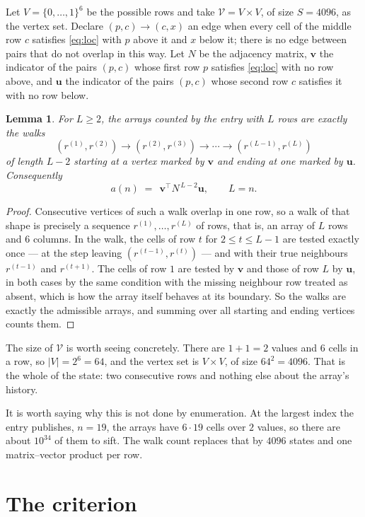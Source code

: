 \documentclass[11pt,a4paper]{article}
\theoremstyle{plain}
\newtheorem{lemma}[theorem]{Lemma}
\theoremstyle{definition}
\begin{document}
Let $V=\{0,\dots,1\}^{6}$ be the possible rows and take
$\mathcal V=V\times V$, of size $S=4096$, as the vertex set. Declare $(p,c)\to(c,x)$ an edge
when every cell of the middle row $c$ satisfies \eqref{eq:loc} with $p$ above it and $x$
below it; there is no edge between pairs that do not overlap in this way. Let $N$ be the
adjacency matrix, $\mathbf{v}$ the indicator of the pairs $(p,c)$ whose first row $p$
satisfies \eqref{eq:loc} with no row above, and $\mathbf{u}$ the indicator of
the pairs $(p,c)$ whose second row $c$ satisfies it with no row below.

\begin{lemma}\label{lem:walk}
For $L\ge2$, the arrays counted by the entry with $L$ rows are exactly the walks
\[
(r^{(1)},r^{(2)})\to(r^{(2)},r^{(3)})\to\cdots\to(r^{(L-1)},r^{(L)})
\]
of length $L-2$ starting at a vertex marked by $\mathbf{v}$ and ending at one marked by
$\mathbf{u}$. Consequently
\[
a(n)\;=\;\,\mathbf{v}^{\!\top}N^{\,L-2}\mathbf{u},\qquad L=n .
\]
\end{lemma}

\begin{proof}
Consecutive vertices of such a walk overlap in one row, so a walk of that shape is
precisely a sequence $r^{(1)},\dots,r^{(L)}$ of rows, that is, an array of $L$ rows
and $6$ columns. In the walk, the cells of row $t$ for $2\le t\le L-1$ are tested
exactly once --- at the step leaving $(r^{(t-1)},r^{(t)})$ --- and with their true
neighbours $r^{(t-1)}$ and $r^{(t+1)}$. The cells of row $1$ are tested by
$\mathbf{v}$ and those of row $L$ by $\mathbf{u}$, in both cases by the same condition
with the missing neighbour row treated as absent, which is how the array itself behaves at
its boundary. So the walks are exactly the admissible arrays, and summing over all starting
and ending vertices counts them.
\end{proof}


The size of $\mathcal V$ is worth seeing concretely. There are $1+1=2$ values
and $6$ cells in a row, so $|V|=2^{6}=64$, and the vertex set is
$V\times V$, of size $64^2=4096$. That is the whole of the state: two consecutive
rows and nothing else about the array's history.

It is worth saying why this is not done by enumeration. At the largest index the entry
publishes, $n=19$, the arrays have $6\cdot19$ cells over
$2$ values, so there are about $10^{34}$ of them to sift. The
walk count replaces that by $4096$ states and one matrix--vector product per row.
\section{The criterion}
\end{document}
